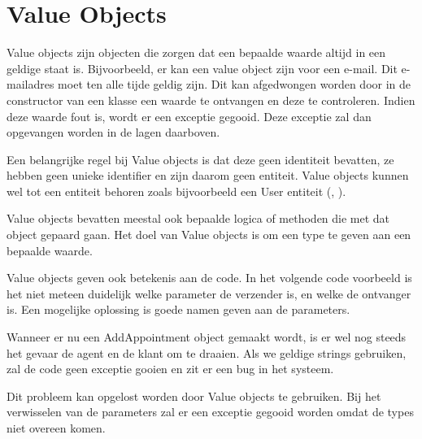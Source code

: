 
\section{Value Objects}
\label{sec:value-objects}

Value objects zijn objecten die zorgen dat een bepaalde waarde altijd in een geldige staat is. Bijvoorbeeld, er kan een value object zijn voor een e-mail. Dit e-mailadres moet ten alle tijde geldig zijn. Dit kan afgedwongen worden door in de constructor van een klasse een waarde te ontvangen en deze te controleren. Indien deze waarde fout is, wordt er een exceptie gegooid. Deze exceptie zal dan opgevangen worden in de lagen daarboven.

Een belangrijke regel bij Value objects is dat deze geen identiteit bevatten, ze hebben geen unieke identifier en zijn daarom geen entiteit. Value objects kunnen wel tot een entiteit behoren zoals bijvoorbeeld een User entiteit (\textcite{Verraes2015ValueObjects}, \textcite{Claes2013Identity}).

Value objects bevatten meestal ook bepaalde logica of methoden die met dat object gepaard gaan. Het doel van Value objects is om een type te geven aan een bepaalde waarde.

Value objects geven ook betekenis aan de code. In het volgende code voorbeeld is het niet meteen duidelijk welke parameter de verzender is, en welke de ontvanger is. Een mogelijke oplossing is goede namen geven aan de parameters.


Wanneer er nu een AddAppointment object gemaakt wordt, is er wel nog steeds het gevaar de agent en de klant om te draaien. Als we geldige strings gebruiken, zal de code geen exceptie gooien en zit er een bug in het systeem.

Dit probleem kan opgelost worden door Value objects te gebruiken. Bij het verwisselen van de parameters zal er een exceptie gegooid worden omdat de types niet overeen komen.

